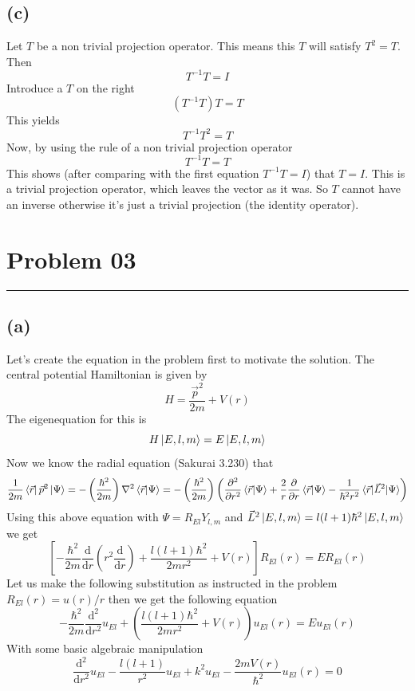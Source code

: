 \documentclass[letter, 10pts]{article}
\newcommand{\hb}{\hbar}
\begin{document}
\subsection*{(c)} 
Let $T$ be a non trivial projection operator. This means this $T$ will satisfy $T^2 = T$. Then 
\[
T^{-1} T = I 
\]
Introduce a $T$ on the right
\[
	(T^{-1} T) T = T 
\]
This yields
\[
T^{-1} T^2 = T 
\]
Now, by using the rule of a non trivial projection operator 
\[
T^{-1} T = T 
\] 
This shows (after comparing with the first equation $T^{-1} T = I$) that $T = I$. This is a trivial projection operator, which leaves the vector as it was. So $T$ cannot have an inverse otherwise it's just a trivial projection (the identity operator). 





\section*{Problem 03} 
\hrule 
\subsection*{(a)} 

Let's create the equation in the problem first to motivate the solution. The central potential Hamiltonian is given by 
\[
H = \frac{\vec{p}^2}{2m} + V(r)
\]
The eigenequation for this is 
\[
H \ket{E,l,m} = E \ket{E,l,m}
\] 
Now we know the radial equation (Sakurai 3.230) that
\[
\frac{1}{2m} \bra{\vec{r}} \vec{p}^2 \ket{\Psi} = 
- \left(\frac{\hb^2}{2m}\right) \nabla ^2 \braket{\vec{r} | \Psi} = 
- \left(\frac{\hb^2}{2m}\right) 
\left(
\frac{\partial ^2}{\partial r^2} \braket{\vec{r} | \Psi} + 
\frac{2}{r} \frac{\partial}{\partial r} \braket{\vec{r} | \Psi} - 
\frac{1}{\hb^2 r^2} \braket{\vec{r} | \vec{L}^2 | \Psi }
\right)
\] 
Using this above equation with $\Psi = R_{El} Y_{l,m}$ and $\vec{L}^2 \ket{E,l,m} = l(l+1) \hb^2 \ket{E,l,m} $ we get 
\[
\left[
- \frac{\hb^2}{2m } \frac{\mathrm{d} }{\mathrm{d} r} 
\left(r^2 \frac{\mathrm{d} }{\mathrm{d} r}\right)
+ 
\frac{l(l+1)\hb^2}{2mr^2} + V(r)
\right] R_{El}(r) = E R_{El}(r)
\] 
Let us make the following substitution as instructed in the problem $R_{El}(r)  = u(r) / r$ then we get the following equation
\[
	- \frac{\hb^2}{2m } \frac{\mathrm{d} ^2}{\mathrm{d} r^2} u_{El} + 
\left(
\frac{l(l+1) \hb^2}{2 m r^2} + V(r) 
\right) u_{El}(r) = Eu_{El}(r)
\] 
With some basic algebraic manipulation
\[
	\frac{\mathrm{d} ^2}{\mathrm{d} r^2} u_{El} - \frac{l(l+1)}{r^2} u_{El} +k^2 u_{El} - \frac{2mV(r)}{\hb^2} u_{El}(r) = 0 
\] 
\end{document}
